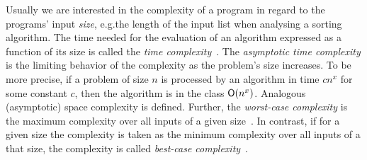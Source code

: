 \documentclass[envcountsame]{llncs}
\begin{document}
Usually we are interested in the complexity of a program in regard to the programs' input
\textit{size}, e.g.\@ the length of the input list when analysing a sorting algorithm.
%
The time needed for the evaluation of an algorithm expressed as a function of its size is called the
\textit{time complexity}~\cite{Aho:1974:DAC:578775}. The \textit{asymptotic time complexity} is the
limiting behavior of the complexity as the problem's size increases. To be more precise, if a
problem of size \(n\) is processed by an algorithm in time \(c n^{x}\) for some constant \(c\), then
the algorithm is in the class \(\mathsf{O}(n^{x})\). Analogous (asymptotic) space complexity is defined.
Further, the \textit{worst-case complexity} is the maximum complexity over all inputs of a given
size~\cite{Aho:1974:DAC:578775}. In contrast, if for a given size the complexity is taken as the
minimum complexity over all inputs of a that size, the complexity is called \textit{best-case
  complexity}~\cite{Wegbreit75}.






\end{document}
